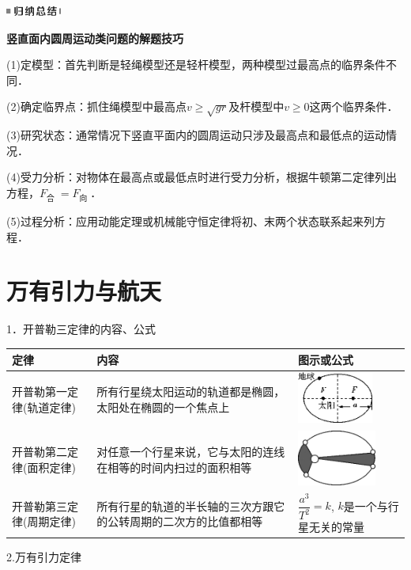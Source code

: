 \begin{center}\includegraphics[width=0.71667in,height=0.13333in]{media/image13.png}

\textbf{竖直面内圆周运动类问题的解题技巧}
\end{center}


(1)定模型：首先判断是轻绳模型还是轻杆模型，两种模型过最高点的临界条件不同．

(2)确定临界点：抓住绳模型中最高点$v \geq \sqrt{g r}$及杆模型中$v \geq 0$这两个临界条件．

(3)研究状态：通常情况下竖直平面内的圆周运动只涉及最高点和最低点的运动情况．

(4)受力分析：对物体在最高点或最低点时进行受力分析，根据牛顿第二定律列出方程，$F_{\text {合 }}=F_{\text {向 }}$．

(5)过程分析：应用动能定理或机械能守恒定律将初、末两个状态联系起来列方程．

\newpage
\section{万有引力与航天}


1．开普勒三定律的内容、公式

\begin{longtable}[]{@{}m{3cm}m{6.5cm}m{3.5cm}@{}}
\toprule
定律 & 内容 & 图示或公式\tabularnewline
\midrule
\endhead
开普勒第一定律(轨道定律) &所有行星绕太阳运动的轨道都是椭圆，太阳处在椭圆的一个焦点上&
\includegraphics[width=0.98333in,height=0.66667in]{media/image198.png}\tabularnewline
开普勒第二定律(面积定律) &对任意一个行星来说，它与太阳的连线在相等的时间内扫过的面积相等 &
\includegraphics[width=1.01667in,height=0.71667in]{media/image199.png}\tabularnewline
开普勒第三定律(周期定律)&所有行星的轨道的半长轴的三次方跟它的公转周期的二次方的比值都相等& 
$\dfrac{a^{3}}{T^{2}}=k$, $k$是一个与行星无关的常量\tabularnewline
\bottomrule
\end{longtable}

2.万有引力定律


